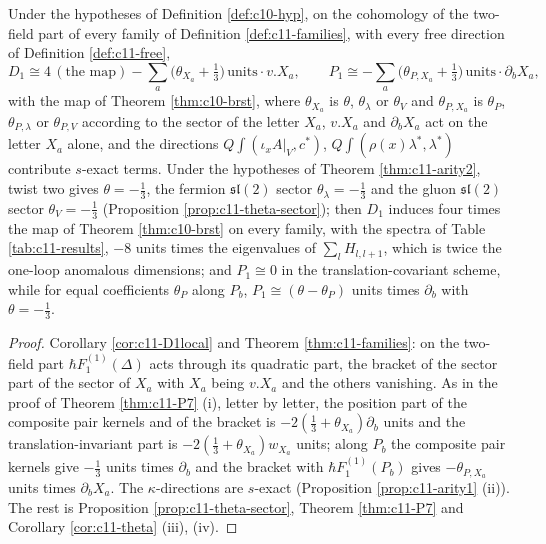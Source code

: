 \begin{corollary}
\label{cor:c11-D1fam}
Under the hypotheses of Definition \ref{def:c10-hyp}, on the cohomology of the two-field part of every family of Definition \ref{def:c11-families}, with every free direction of Definition \ref{def:c11-free},
\[
D_1\cong4\,(\text{the map})-\sum_a\big(\theta_{X_a}+\tfrac13\big)\,\text{units}\cdot v.X_a,\qquad P_1\cong-\sum_a\big(\theta_{P,X_a}+\tfrac13\big)\,\text{units}\cdot\partial_bX_a,
\]
with the map of Theorem \ref{thm:c10-brst}, where $\theta_{X_a}$ is $\theta$, $\theta_\lambda$ or $\theta_V$ and $\theta_{P,X_a}$ is $\theta_P$, $\theta_{P,\lambda}$ or $\theta_{P,V}$ according to the sector of the letter $X_a$, $v.X_a$ and $\partial_bX_a$ act on the letter $X_a$ alone, and the directions $Q\int(\iota_xA|_V,c^*)$, $Q\int(\rho(x)\lambda^*,\lambda^*)$ contribute $s$-exact terms. Under the hypotheses of Theorem \ref{thm:c11-arity2}, twist two gives $\theta=-\tfrac13$, the fermion $\mathfrak{sl}(2)$ sector $\theta_\lambda=-\tfrac13$ and the gluon $\mathfrak{sl}(2)$ sector $\theta_V=-\tfrac13$ (Proposition \ref{prop:c11-theta-sector}); then $D_1$ induces four times the map of Theorem \ref{thm:c10-brst} on every family, with the spectra of Table \ref{tab:c11-results}, $-8$ units times the eigenvalues of $\sum_lH_{l,l+1}$, which is twice the one-loop anomalous dimensions; and $P_1\cong0$ in the translation-covariant scheme, while for equal coefficients $\theta_P$ along $P_b$, $P_1\cong(\theta-\theta_P)$ units times $\partial_b$ with $\theta=-\tfrac13$.
\end{corollary}

\begin{proof}
Corollary \ref{cor:c11-D1local} and Theorem \ref{thm:c11-families}: on the two-field part $\hbar F_1^{(1)}(\Delta)$ acts through its quadratic part, the bracket of the sector part of the sector of $X_a$ with $X_a$ being $v.X_a$ and the others vanishing. As in the proof of Theorem \ref{thm:c11-P7} (i), letter by letter, the position part of the composite pair kernels and of the bracket is $-2(\tfrac13+\theta_{X_a})\partial_b$ units and the translation-invariant part is $-2(\tfrac13+\theta_{X_a})w_{X_a}$ units; along $P_b$ the composite pair kernels give $-\tfrac13$ units times $\partial_b$ and the bracket with $\hbar F_1^{(1)}(P_b)$ gives $-\theta_{P,X_a}$ units times $\partial_bX_a$. The $\kappa$-directions are $s$-exact (Proposition \ref{prop:c11-arity1} (ii)). The rest is Proposition \ref{prop:c11-theta-sector}, Theorem \ref{thm:c11-P7} and Corollary \ref{cor:c11-theta} (iii), (iv).
\end{proof}

